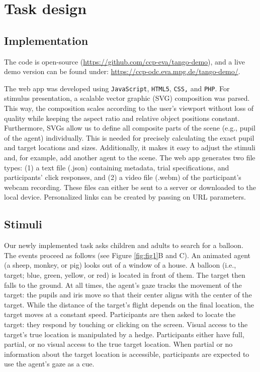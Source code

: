 \documentclass[
  man,floatsintext]{apa7}
\begin{document}
\hypertarget{task-design}{%
\section{Task design}\label{task-design}}

\hypertarget{implementation}{%
\subsection{Implementation}\label{implementation}}

The code is open-source (\url{https://github.com/ccp-eva/tango-demo}), and a live demo version can be found under: \url{https://ccp-odc.eva.mpg.de/tango-demo/}.

The web app was developed using \texttt{JavaScript}, \texttt{HTML5}, \texttt{CSS,} and \texttt{PHP}.
For stimulus presentation, a scalable vector graphic (SVG) composition was parsed.
This way, the composition scales according to the user's viewport without loss of quality while keeping the aspect ratio and relative object positions constant.
Furthermore, SVGs allow us to define all composite parts of the scene (e.g., pupil of the agent) individually.
This is needed for precisely calculating the exact pupil and target locations and sizes.
Additionally, it makes it easy to adjust the stimuli and, for example, add another agent to the scene.
The web app generates two file types: (1) a text file (.json) containing metadata, trial specifications, and participants' click responses, and (2) a video file (.webm) of the participant's webcam recording.
These files can either be sent to a server or downloaded to the local device.
Personalized links can be created by passing on URL parameters.

\hypertarget{stimuli}{%
\subsection{Stimuli}\label{stimuli}}

Our newly implemented task asks children and adults to search for a balloon.
The events proceed as follows (see Figure \ref{fig:fig1}B and C).
An animated agent (a sheep, monkey, or pig) looks out of a window of a house.
A balloon (i.e., target; blue, green, yellow, or red) is located in front of them.
The target then falls to the ground.
At all times, the agent's gaze tracks the movement of the target: the pupils and iris move so that their center aligns with the center of the target.
While the distance of the target's flight depends on the final location, the target moves at a constant speed.
Participants are then asked to locate the target: they respond by touching or clicking on the screen.
Visual access to the target's true location is manipulated by a hedge.
Participants either have full, partial, or no visual access to the true target location.
When partial or no information about the target location is accessible, participants are expected to use the agent's gaze as a cue.
\end{document}

